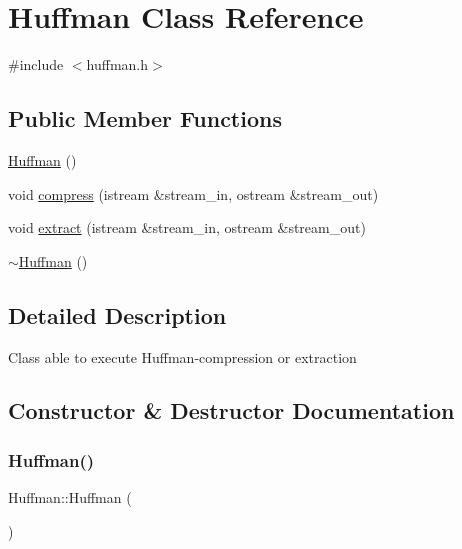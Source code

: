 \hypertarget{class_huffman}{}\section{Huffman Class Reference}
\label{class_huffman}


{\ttfamily \#include $<$huffman.\+h$>$}

\subsection*{Public Member Functions}
\begin{DoxyCompactItemize}
\item 
\hyperlink{class_huffman_a58af969e1cd59bd981f1461e8a51822c}{Huffman} ()
\item 
void \hyperlink{class_huffman_a692805d2f9f60f0a4663ec027b6f196d}{compress} (istream \&stream\+\_\+in, ostream \&stream\+\_\+out)
\item 
void \hyperlink{class_huffman_aca6b32706e62035b9dd6d7c9edba745e}{extract} (istream \&stream\+\_\+in, ostream \&stream\+\_\+out)
\item 
\hyperlink{class_huffman_a641376a7cb5871a6a2c7b51afb05bfcc}{$\sim$\+Huffman} ()
\end{DoxyCompactItemize}


\subsection{Detailed Description}
Class able to execute Huffman-\/compression or extraction 

\subsection{Constructor \& Destructor Documentation}
\mbox{\label{class_huffman_a58af969e1cd59bd981f1461e8a51822c}} 
\subsubsection{\texorpdfstring{Huffman()}{Huffman()}}
{\footnotesize\ttfamily Huffman\+::\+Huffman (\begin{DoxyParamCaption}{ }\end{DoxyParamCaption})}

\mbox{\label{class_huffman_a641376a7cb5871a6a2c7b51afb05bfcc}} 
